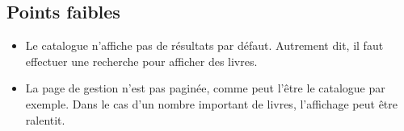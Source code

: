 	\subsection{Points faibles}
	\begin{itemize}
		\item Le catalogue n'affiche pas de résultats par défaut. Autrement dit, il faut effectuer une recherche pour afficher des livres.

		\item La page de gestion n'est pas paginée, comme peut l'être le catalogue par exemple. Dans le cas d'un nombre important de livres, l'affichage peut être ralentit.
	\end{itemize}
